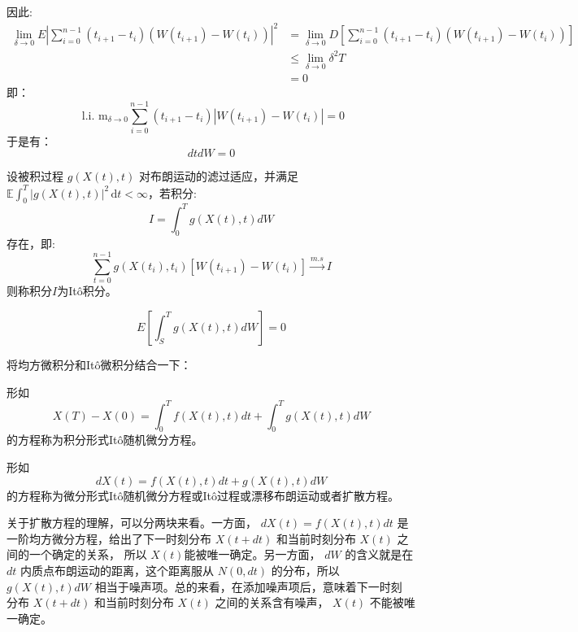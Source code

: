 因此:
$$
\begin{aligned}
\lim _{\delta \rightarrow 0} E\left|\sum_{i=0}^{n-1}\left(t_{i+1}-t_i\right)\left(W\left(t_{i+1}\right)-W\left(t_i\right)\right)\right|^2 & =\lim _{\delta \rightarrow 0} D\left[\sum_{i=0}^{n-1}\left(t_{i+1}-t_i\right)\left(W\left(t_{i+1}\right)-W\left(t_i\right)\right)\right] \\
& \leq \lim _{\delta \rightarrow 0} \delta^2 T \\
& =0
\end{aligned}
$$
即：
$$
\text { l.i. } \mathrm{m}_{\delta \rightarrow 0} \sum_{i=0}^{n-1}\left(t_{i+1}-t_i\right)\left|W\left(t_{i+1}\right)-W\left(t_i\right)\right|=0
$$
于是有：
\begin{equation}
  dt dW = 0
\end{equation}

\begin{definition}[Itô积分]
  设被积过程 $g(X(t),t)$ 对布朗运动的滤过适应，并满足 $\mathbb E\int_0^T|g(X(t),t)|^2\,\mathrm dt<\infty$，若积分:
  \begin{equation}
    I=\int_0^T g(X(t), t) d W
  \end{equation}
  存在，即:
$$
\sum_{t=0}^{n-1} g\left(X\left(t_i\right), t_i\right)\left[W\left(t_{i+1}\right)-W\left(t_i\right)\right] \xrightarrow{m . s} I
$$
则称积分$I$为Itô积分。
\end{definition}

\begin{property}
  \begin{equation}
    E\left[\int_S^T g(X(t), t) d W\right]=0
    \end{equation}
\end{property}

将均方微积分和Itô微积分结合一下：
\begin{definition}[Itô随机微分方程]
  形如
  \begin{equation}
    X(T)-X(0)=\int_0^T f(X(t), t) d t+\int_0^T g(X(t), t) d W
  \end{equation}
  的方程称为积分形式Itô随机微分方程。
\end{definition}

\begin{definition}[扩散方程]
  形如
  \begin{equation}
    d X(t)=f(X(t), t) d t+g(X(t), t) d W
  \end{equation}
  的方程称为微分形式Itô随机微分方程或Itô过程或漂移布朗运动或者扩散方程。
\end{definition}
关于扩散方程的理解，可以分两块来看。一方面， $d X(t)=f(X(t), t) d t$ 
是一阶均方微分方程，给出了下一时刻分布 $X(t+d t)$ 和当前时刻分布 $X(t)$ 之间的一个确定的关系，
所以 $X(t)$能被唯一确定。另一方面， $d W$ 的含义就是在 $d t$ 内质点布朗运动的距离，这个距离服从 
$N(0, d t)$ 的分布，所以 $g(X(t), t) d W$ 相当于噪声项。总的来看，在添加噪声项后，意味着下一时刻
分布 $X(t+d t)$ 和当前时刻分布 $X(t)$ 之间的关系含有噪声， $X(t)$ 不能被唯一确定。

